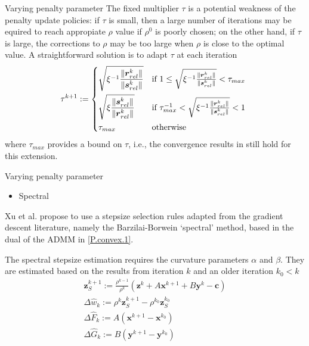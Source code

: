 \documentclass[8pt,red]{beamer}
\theoremstyle{plain}
\theoremstyle{definition}
\theoremstyle{remark}
\newcommand{\bi}[1]{\ensuremath{\boldsymbol{#1}}}
\begin{document}
\begin{frame}{Varying penalty parameter}
The fixed multiplier $\tau$ is a potential weakness of the penalty update policies: if $\tau$ is small, then a large number of iterations may be equired to reach appropiate $\rho$ value if $\rho^{0}$ is poorly chosen; on the other hand, if $\tau$ is large, the corrections to $\rho$ may be too large when $\rho$ is close to the optimal value. A straightforward solution is to adapt $\tau$ at each iteration
\begin{align}
  \tau^{k+1} := 
  \begin{dcases*}
	\sqrt{\xi^{-1} \frac{\| \bi{r}_{rel}^{k} \|}{\| \bi{s}_{rel}^{k} \|}}
    & if $1 \leq \sqrt{\xi^{-1} \frac{\| \bi{r}_{rel}^{k} \|}{\| \bi{s}_{rel}^{k} \|}} < \tau_{max}$ \\
    \sqrt{\xi \frac{\| \bi{s}_{rel}^{k} \|}{\| \bi{r}_{rel}^{k} \|}}
    & if $\tau_{max}^{-1} < \sqrt{\xi^{-1} \frac{\| \bi{r}_{rel}^{k} \|}{\| \bi{s}_{rel}^{k} \|}} < 1$ \\
    \tau_{max}
    & otherwise \\
  \end{dcases*}  
\end{align}
where $\tau_{max}$ provides a bound on $\tau$, i.e., the convergence results in \citep{He2000} still hold for this extension.
\end{frame}

\begin{frame}{Varying penalty parameter}
\begin{itemize}
\item Spectral
\end{itemize}
Xu et al. \citep{xu2016adaptive} propose to use a stepsize selection rules adapted from the gradient descent literature, namely the Barzilai-Borwein `spectral' method, based in the dual of the ADMM in \eqref{P.convex.1}.

The spectral stepsize estimation requires the curvature parameters $\alpha$ and $\beta$. They are estimated based on the results from iteration $k$ and an older iteration $k_{0} < k$
\begin{align}
  \bi{z}_{S}^{k+1} := \frac{\rho^{k-1}}{\rho^{k}} \left(\bi{z}^{k} + A \bi{x}^{k+1} + B \bi{y}^{k} - \bi{c}\right) \\
  \Delta \hat{w}_{k} := \rho^{k} \bi{z}_{S}^{k+1} - \rho^{k_{0}} \bi{z}_{S}^{k_{0}} \\
  \Delta \hat{F}_{k} := A \left( \bi{x}^{k+1} - \bi{x}^{k_{0}} \right) \\
  \Delta \hat{G}_{k} := B \left( \bi{y}^{k+1} - \bi{y}^{k_{0}} \right)
\end{align}
\end{frame}
\end{document}
